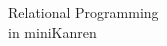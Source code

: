 \thispagestyle{empty}

\begin{fullwidth}
\rmfamily  
\itshape
\noindent\fontsize{20}{24}\selectfont
\thanklessauthor

\vspace{10.5pc}%

\upshape
\noindent\fontsize{36}{38}\selectfont
\nohyphenation
Relational Programming\\\noindent in miniKanren

\normalsize

~\vfill

\end{fullwidth}
